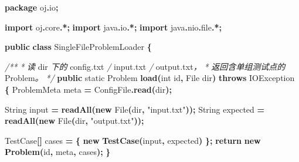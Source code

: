 \documentclass[
  11pt,
]{ctexart}
\newenvironment{Shaded}{\begin{snugshade}}{\end{snugshade}}
\newcommand{\BuiltInTok}[1]{#1}
\newcommand{\CommentTok}[1]{\textcolor[rgb]{0.56,0.35,0.01}{\textit{#1}}}
\newcommand{\ControlFlowTok}[1]{\textcolor[rgb]{0.13,0.29,0.53}{\textbf{#1}}}
\newcommand{\DataTypeTok}[1]{\textcolor[rgb]{0.13,0.29,0.53}{#1}}
\newcommand{\FunctionTok}[1]{\textcolor[rgb]{0.13,0.29,0.53}{\textbf{#1}}}
\newcommand{\ImportTok}[1]{#1}
\newcommand{\KeywordTok}[1]{\textcolor[rgb]{0.13,0.29,0.53}{\textbf{#1}}}
\newcommand{\NormalTok}[1]{#1}
\newcommand{\OperatorTok}[1]{\textcolor[rgb]{0.81,0.36,0.00}{\textbf{#1}}}
\newcommand{\StringTok}[1]{\textcolor[rgb]{0.31,0.60,0.02}{#1}}
\begin{document}
\begin{Shaded}
\begin{Highlighting}[]
\KeywordTok{package}\ImportTok{ oj}\OperatorTok{.}\ImportTok{io}\OperatorTok{;}

\KeywordTok{import} \ImportTok{oj}\OperatorTok{.}\ImportTok{core}\OperatorTok{.*;}
\KeywordTok{import} \ImportTok{java}\OperatorTok{.}\ImportTok{io}\OperatorTok{.*;}
\KeywordTok{import} \ImportTok{java}\OperatorTok{.}\ImportTok{nio}\OperatorTok{.}\ImportTok{file}\OperatorTok{.*;}

\KeywordTok{public} \KeywordTok{class}\NormalTok{ SingleFileProblemLoader }\OperatorTok{\{}

    \CommentTok{/**}
     \CommentTok{*} \CommentTok{读}\NormalTok{ dir }\CommentTok{下的}\NormalTok{ config}\CommentTok{.}\NormalTok{txt }\CommentTok{/}\NormalTok{ input}\CommentTok{.}\NormalTok{txt }\CommentTok{/}\NormalTok{ output}\CommentTok{.}\NormalTok{txt}\CommentTok{，}
     \CommentTok{*} \CommentTok{返回含单组测试点的}\NormalTok{ Problem}\CommentTok{。}
     \CommentTok{*/}
    \KeywordTok{public} \DataTypeTok{static}\NormalTok{ Problem }\FunctionTok{load}\OperatorTok{(}\DataTypeTok{int}\NormalTok{ id}\OperatorTok{,} \BuiltInTok{File}\NormalTok{ dir}\OperatorTok{)} \KeywordTok{throws} \BuiltInTok{IOException} \OperatorTok{\{}
\NormalTok{        ProblemMeta meta }\OperatorTok{=}\NormalTok{ ConfigFile}\OperatorTok{.}\FunctionTok{read}\OperatorTok{(}\NormalTok{dir}\OperatorTok{);}

        \BuiltInTok{String}\NormalTok{ input    }\OperatorTok{=} \FunctionTok{readAll}\OperatorTok{(}\KeywordTok{new} \BuiltInTok{File}\OperatorTok{(}\NormalTok{dir}\OperatorTok{,} \StringTok{"input.txt"}\OperatorTok{));}
        \BuiltInTok{String}\NormalTok{ expected }\OperatorTok{=} \FunctionTok{readAll}\OperatorTok{(}\KeywordTok{new} \BuiltInTok{File}\OperatorTok{(}\NormalTok{dir}\OperatorTok{,} \StringTok{"output.txt"}\OperatorTok{));}

\NormalTok{        TestCase}\OperatorTok{[]}\NormalTok{ cases }\OperatorTok{=} \OperatorTok{\{} \KeywordTok{new} \FunctionTok{TestCase}\OperatorTok{(}\NormalTok{input}\OperatorTok{,}\NormalTok{ expected}\OperatorTok{)} \OperatorTok{\};}
        \ControlFlowTok{return} \KeywordTok{new} \FunctionTok{Problem}\OperatorTok{(}\NormalTok{id}\OperatorTok{,}\NormalTok{ meta}\OperatorTok{,}\NormalTok{ cases}\OperatorTok{);}
    \OperatorTok{\}}


\end{Highlighting}
\end{Shaded}
\end{document}
